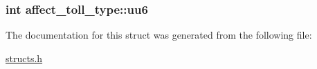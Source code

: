 \hypertarget{structaffect__toll__type_a7fde23a18f8071a1228a71af20b52c63}{
\subsubsection[{uu6}]{\setlength{\rightskip}{0pt plus 5cm}int affect\-\_\-toll\-\_\-type\-::uu6}}\label{structaffect__toll__type_a7fde23a18f8071a1228a71af20b52c63}


The documentation for this struct was generated from the following file\-:\begin{DoxyCompactItemize}
\item 
\hyperlink{structs_8h}{structs.\-h}\end{DoxyCompactItemize}
